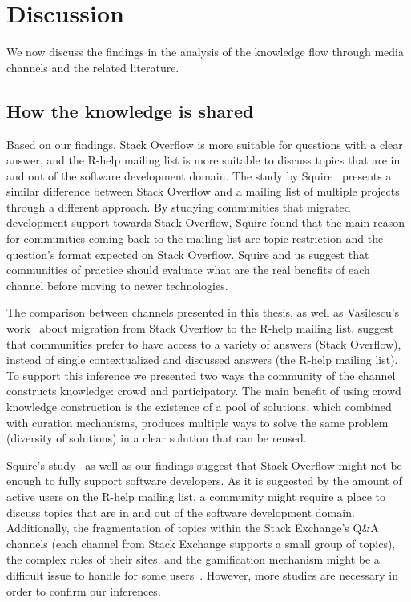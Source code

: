 \documentclass{sig-alternate-05-2015}
\begin{document}
\section{Discussion}
\label{cha:discussion}

	We now discuss the findings in the analysis of the knowledge flow through media channels and the related literature. 

\subsection{How the knowledge is shared}

	Based on our findings, Stack Overflow is more suitable for questions with a clear answer, and the R-help mailing list is more suitable to discuss topics that are in and out of the software development domain.
	The study by Squire~\cite{Squire2015a} presents a similar difference between Stack Overflow and a mailing list of multiple projects through a different approach. 
	By studying communities that migrated development support towards Stack Overflow, Squire found that the main reason for communities coming back to the mailing list are topic restriction and the question's format expected on Stack Overflow.
	Squire and us suggest that communities of practice should evaluate what are the real benefits of each channel before moving to newer technologies.

	The comparison between channels presented in this thesis, as well as Vasilescu's work~\cite{Vasilescu2014c} about migration from Stack Overflow to the R-help mailing list, suggest that communities prefer to have access to a variety of answers (Stack Overflow), instead of single contextualized and discussed answers (the R-help mailing list). 
	To support this inference we presented two ways the community of the channel constructs knowledge: crowd and participatory. 
	The main benefit of using crowd knowledge construction is the existence of a pool of solutions, which combined with curation mechanisms, produces multiple ways to solve the same problem (diversity of solutions) in a clear solution that can be reused.

	Squire's study~\cite{Squire2015a} as well as our findings suggest that Stack Overflow might not be enough to fully support software developers.
	As it is suggested by the amount of active users on the R-help mailing list, a community might require a place to discuss topics that are in and out of the software development domain.
	Additionally, the fragmentation of topics within the Stack Exchange's Q\&A channels (each channel from Stack Exchange supports a small group of topics), the complex rules of their sites, and the gamification mechanism might be a difficult issue to handle for some users~\cite{Vasilescu2013}.
	However, more studies are necessary in order to confirm our inferences. 
\end{document}
